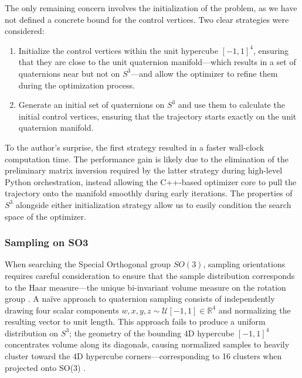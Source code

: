 The only remaining concern involves the initialization of the problem, as we have not defined a concrete bound for the control vertices.
Two clear strategies were considered:
\begin{enumerate}
    \item Initialize the control vertices within the unit hypercube $[-1,1]^4$, ensuring that they are close to the unit quaternion manifold---which results in a set of quaternions near but not on $S^3$---and allow the optimizer to refine them during the optimization process.
    \item Generate an initial set of quaternions on $S^3$ and use them to calculate the initial control vertices, ensuring that the trajectory starts exactly on the unit quaternion manifold.
\end{enumerate}
To the author's surprise, the first strategy resulted in a faster wall-clock computation time.
The performance gain is likely due to the elimination of the preliminary matrix inversion required by the latter strategy during high-level Python orchestration, instead allowing the C++-based optimizer core to pull the trajectory onto the manifold smoothly during early iterations.
The properties of $S^3$ alongside either initialization strategy allow us to easily condition the search space of the optimizer. 

\subsubsection{Sampling on \ac{SO3}}
\label{sec:SampleSO3}
When searching the Special Orthogonal group $SO(3)$, sampling orientations requires careful consideration to ensure that the sample distribution corresponds to the Haar measure—the unique bi-invariant volume measure on the rotation group \cite{LaValle06, Kuffner04}. 
A naïve approach to quaternion sampling consists of independently drawing four scalar components $w, x, y, z \sim \mathcal{U}[-1, 1] \in \mathbb{R}^4$ and normalizing the resulting vector to unit length. 
This approach fails to produce a uniform distribution on $S^3$; 
the geometry of the bounding 4D hypercube $[-1, 1]^4$ concentrates volume along its diagonals, causing normalized samples to heavily cluster toward the 4D hypercube corners---corresponding to 16 clusters when projected onto SO(3) \cite{LaValle06}. 

